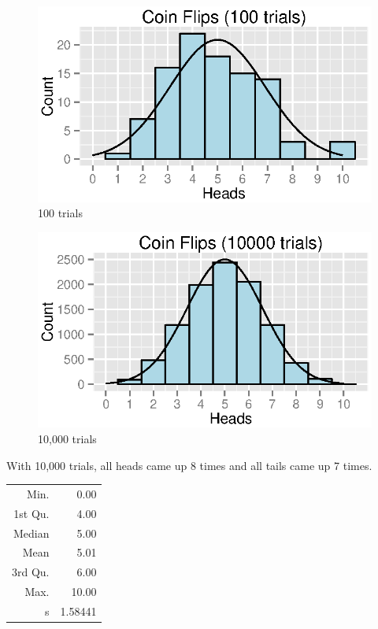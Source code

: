 \documentclass{exam}
\begin{document}
  \begin{figure}[H]
    \centering
    \includegraphics{figures/coins/100_10.eps}
    \caption{100 trials}
  \end{figure}

  \begin{figure}[H]
    \centering
    \includegraphics{figures/coins/10000_10.eps}
    \caption{10,000 trials}
  \end{figure}

  With 10,000 trials, all heads came up 8 times and all tails came up 7 times.

  \begin{table}[H]
    \centering
    \begin{tabular}{rr}
      \toprule
      Min.    & 0.00 \\
      1st Qu. & 4.00 \\
      Median  & 5.00 \\
      Mean    & 5.01 \\
      3rd Qu. & 6.00 \\
      Max.    & 10.00 \\
      s       & 1.58441 \\
      \bottomrule
    \end{tabular}
  \end{table}
\end{document}
